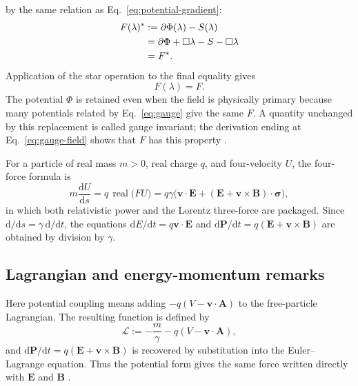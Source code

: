 \documentclass[10pt,letterpaper]{article}
\newcommand{\eqfunc}[1]{\operatorname{#1}}
\newcommand{\pv}[1]{#1}
\newcommand{\vct}[1]{\mathbf{#1}}
\newcommand{\sigv}{\vct{\pv{\bm{\sigma}}}}
\newcommand{\conj}[1]{#1^{*}}
\newcommand{\dd}{\mathrm d}
\begin{document}
by the same relation as Eq.\ \eqref{eq:potential-gradient}:
\begin{align}
\conj{\pv{F}(\lambda)}
&:=\pv{\partial}\pv{\Phi}(\lambda)-S(\lambda)\notag\\
&=\pv{\partial}\pv{\Phi}+\Box\lambda-S-\Box\lambda\notag\\
&=\conj{\pv{F}}.
\label{eq:gauge-field-from-potential}
\end{align}
Application of the star operation to the final equality gives
\begin{equation}
\pv{F}(\lambda)=\pv{F}.
\label{eq:gauge-field}
\end{equation}
The potential \(\pv{\Phi}\) is retained even when the field is physically
primary because many potentials related by Eq.\ \eqref{eq:gauge} give the
same \(\pv{F}\). A quantity unchanged by this replacement is called gauge
invariant; the derivation ending at Eq.\ \eqref{eq:gauge-field} shows that
\(\pv{F}\) has
this property \cite{jackson1998}.

For a particle of real mass \(m>0\), real charge \(q\), and four-velocity \(\pv{U}\), the four-force formula is
\begin{equation}
m\frac{\dd \pv{U}}{\dd s}=q\,\eqfunc{real}\bigl(\pv{F}\pv{U}\bigr)
=q\gamma\Big(\vct{v}\cdot\vct{E}+(\vct{E}+\vct{v}\times\vct{B})\cdot\sigv\Big),
\label{eq:lorentz-force}
\end{equation}
in which both relativistic power and the Lorentz three-force are packaged. Since \(\dd/\dd s=\gamma\,\dd/\dd t\), the equations \(\dd E/\dd t=q\vct{v}\cdot\vct{E}\) and \(\dd\vct{P}/\dd t=q(\vct{E}+\vct{v}\times\vct{B})\) are obtained by division by \(\gamma\).

\subsection{Lagrangian and energy-momentum remarks}
Here potential coupling means adding
\(-q(V-\vct{v}\cdot\vct{A})\) to the free-particle Lagrangian. The resulting
function is defined by
\begin{equation}
\mathcal L:=-\frac{m}{\gamma}-q(V-\vct{v}\cdot\vct{A}),
\label{eq:em-lagrangian}
\end{equation}
and
\(\dd\vct{P}/\dd t=q(\vct{E}+\vct{v}\times\vct{B})\) is recovered by
substitution into the Euler--Lagrange equation. Thus the potential form gives
the same force written directly with \(\vct{E}\) and \(\vct{B}\)
\cite{jackson1998}.
\end{document}
